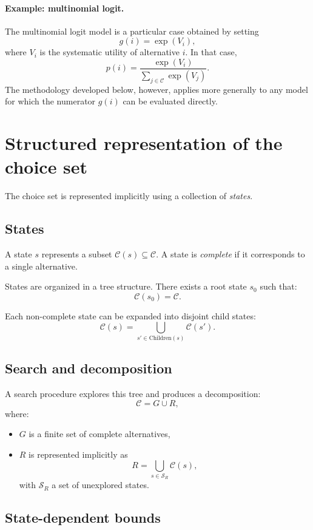 \documentclass[11pt]{article}
\begin{document}
\paragraph{Example: multinomial logit.}
The multinomial logit model is a particular case obtained by setting
\[
g(i) = \exp(V_i),
\]
where $V_i$ is the systematic utility of alternative $i$. In that case,
\[
p(i) = \frac{\exp(V_i)}{\sum_{j \in \mathcal{C}} \exp(V_j)}.
\]
The methodology developed below, however, applies more generally to any model for which the numerator $g(i)$ can be evaluated directly.

\section{Structured representation of the choice set}

The choice set is represented implicitly using a collection of \emph{states}.

\subsection{States}

A state $s$ represents a subset $\mathcal{C}(s) \subseteq \mathcal{C}$. A state is \emph{complete} if it corresponds to a single alternative.

States are organized in a tree structure. There exists a root state $s_0$ such that:
\[
\mathcal{C}(s_0) = \mathcal{C}.
\]

Each non-complete state can be expanded into disjoint child states:
\[
\mathcal{C}(s) = \bigcup_{s' \in \text{Children}(s)} \mathcal{C}(s').
\]

\subsection{Search and decomposition}

A search procedure explores this tree and produces a decomposition:
\[
\mathcal{C} = G \cup R,
\]
where:
\begin{itemize}
\item $G$ is a finite set of complete alternatives,
\item $R$ is represented implicitly as
\[
R = \bigcup_{s \in \mathcal{S}_R} \mathcal{C}(s),
\]
with $\mathcal{S}_R$ a set of unexplored states.
\end{itemize}

\subsection{State-dependent bounds}
\end{document}
